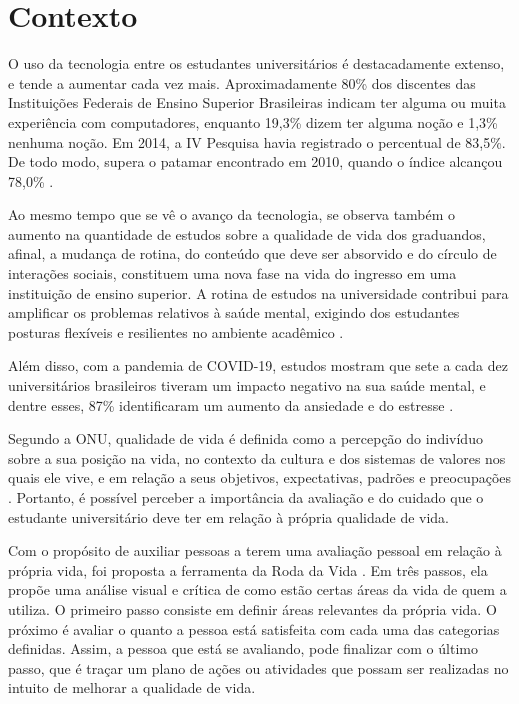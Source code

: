 \section{Contexto}\label{contextualizacao}

O uso da tecnologia entre os estudantes universitários é destacadamente extenso, e tende a aumentar cada vez mais. Aproximadamente 80\% dos discentes das Instituições Federais de Ensino Superior Brasileiras indicam ter alguma ou muita experiência com computadores, enquanto 19,3\% dizem ter alguma noção e 1,3\% nenhuma noção. Em 2014, a IV Pesquisa havia registrado o percentual de 83,5\%. De todo modo, supera o patamar encontrado em 2010, quando o índice alcançou 78,0\% \cite{fonaprace2019}.

Ao mesmo tempo que se vê o avanço da tecnologia, se observa também o aumento na quantidade de estudos sobre a qualidade de vida dos graduandos, afinal, a mudança de rotina, do conteúdo que deve ser absorvido e do círculo de interações sociais, constituem uma nova fase na vida do ingresso em uma instituição de ensino superior. A rotina de estudos na universidade contribui para amplificar os problemas relativos à saúde mental, exigindo dos estudantes posturas flexíveis e resilientes no ambiente acadêmico \cite{fonaprace2019}.

Além disso, com a pandemia de COVID-19, estudos mostram que sete a cada dez universitários brasileiros tiveram um impacto negativo na sua saúde mental, e dentre esses, 87\% identificaram um aumento da ansiedade e do estresse \cite{chegg2021}.

Segundo a ONU, qualidade de vida é definida como a percepção do indivíduo sobre a sua posição na vida, no contexto da cultura e dos sistemas de valores nos quais ele vive, e em relação a seus objetivos, expectativas, padrões e preocupações \cite{whoqol1995}. Portanto, é possível perceber a importância da avaliação e do cuidado que o estudante universitário deve ter em relação à própria qualidade de vida.

Com o propósito de auxiliar pessoas a terem uma avaliação pessoal em relação à própria vida, foi proposta a ferramenta da Roda da Vida \cite{coachingtools}. Em três passos, ela propõe uma análise visual e crítica de como estão certas áreas da vida de quem a utiliza. O primeiro passo consiste em definir áreas relevantes da própria vida. O próximo é avaliar o quanto a pessoa está satisfeita com cada uma das categorias definidas. Assim, a pessoa que está se avaliando, pode finalizar com o último passo, que é traçar um plano de ações ou atividades que possam ser realizadas no intuito de melhorar a qualidade de vida.